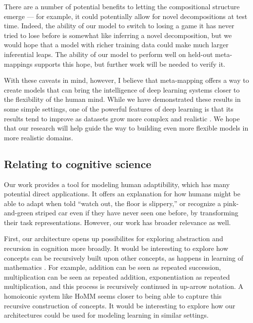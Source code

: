 There are a number of potential benefits to letting the compositional structure emerge --- for example, it could potentially allow for novel decompositions at test time. Indeed, the ability of our model to switch to losing a game it has never tried to lose before is somewhat like inferring a novel decomposition, but we would hope that a model with richer training data could make much larger inferential leaps. The ability of our model to perform well on held-out meta-mappings supports this hope, but further work will be needed to verify it. \par

With these caveats in mind, however, I believe that meta-mapping offers a way to create models that can bring the intelligence of deep learning systems closer to the flexibility of the human mind. While we have demonstrated these results in some simple settings, one of the powerful features of deep learning is that its results tend to improve as datasets grow more complex and realistic \citep{Hill2019a,Radford2019}. We hope that our research will help guide the way to building even more flexible models in more realistic domains.  \par

\subsection{Relating to cognitive science}

Our work provides a tool for modeling human adaptibility, which has many potential direct applications. It offers an explanation for how humans might be able to adapt when told ``watch out, the floor is slippery,'' or recognize a pink-and-green striped car even if they have never seen one before, by transforming their task representations. However, our work has broader relevance as well. \par 

First, our architecture opens up possibilites for exploring abstraction and recursion in cognition more broadly. It would be interesting to explore how concepts can be recursively built upon other concepts, as happens in learning of mathematics \citep{Wilensky1991, Hazzan1999, Lampinen2017b}. For example, addition can be seen as repeated succession, multiplication can be seen as repeated addition, exponentiation as repeated multiplication, and this process is recursively continued in up-arrow notation. A homoiconic system like HoMM seems closer to being able to capture this recursive construction of concepts. It would be interesting to explore how our architectures could be used for modeling learning in similar settings. \par 


